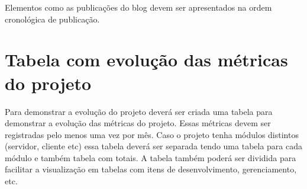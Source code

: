 Elementos como as publicações do blog devem ser apresentados na ordem cronológica de publicação.



\section{Tabela com evolução das métricas do projeto}\label{atv-tabela-metricas}

Para demonstrar a evolução do projeto deverá ser criada uma tabela para demonstrar a evolução das métricas do projeto. Essas métricas devem ser registradas pelo menos uma vez por mês. Caso o projeto tenha módulos distintos (servidor, cliente etc) essa tabela deverá ser separada tendo uma tabela para cada módulo e também tabela com totais. A tabela também poderá ser dividida para facilitar a visualização em tabelas com itens de desenvolvimento, gerenciamento, etc.

